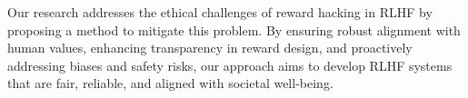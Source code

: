 Our research addresses the ethical challenges of reward hacking in RLHF by proposing a method to mitigate this problem. By ensuring robust alignment with human values, enhancing transparency in reward design, and proactively addressing biases and safety risks, our approach aims to develop RLHF systems that are fair, reliable, and aligned with societal well-being.